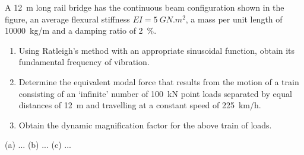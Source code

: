 
\begin{Exercise}[label=rail_bridge]
A \SI{12}{m} long rail bridge has the continuous beam configuration shown in the figure, an average flexural stiffness $EI=\SI{5}{GN.m^2}$, a mass per unit length of \SI{10000}{kg/m} and a damping ratio of \SI{2}{\%}.
\begin{enumerate}
    \item Using Ratleigh's method with an appropriate sinusoidal function, obtain its fundamental frequency of vibration.
    \item Determine the equivalent modal force that results from the motion of a train consisting of an `infinite' number of \SI{100}{kN} point loads separated by equal distances of \SI{12}{m} and travelling at a constant speed of \SI{225}{km/h}.
    \item Obtain the dynamic magnification factor for the above train of loads.
\end{enumerate}

\begin{center}
\end{center}

\shortAnswer (a) ... (b) ... (c) ...
\end{Exercise}



